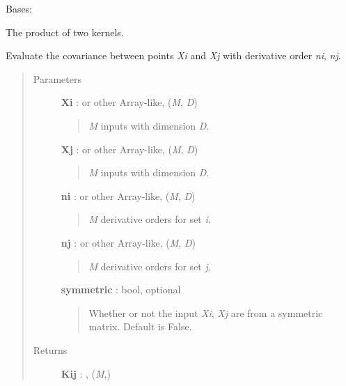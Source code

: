 \documentclass[letterpaper,10pt,english]{sphinxmanual}
\begin{document}
\begin{fulllineitems}
\label{gptools.kernel:gptools.kernel.core.ProductKernel}
Bases: {\hyperref[gptools.kernel:gptools.kernel.core.BinaryKernel]{}}

The product of two kernels.

\begin{fulllineitems}
\label{gptools.kernel:gptools.kernel.core.ProductKernel.__call__}
Evaluate the covariance between points \emph{Xi} and \emph{Xj} with derivative order \emph{ni}, \emph{nj}.
\begin{quote}\begin{description}
\item[{Parameters}] \leavevmode
\textbf{Xi} :  or other Array-like, (\emph{M}, \emph{D})
\begin{quote}

\emph{M} inputs with dimension \emph{D}.
\end{quote}

\textbf{Xj} :  or other Array-like, (\emph{M}, \emph{D})
\begin{quote}

\emph{M} inputs with dimension \emph{D}.
\end{quote}

\textbf{ni} :  or other Array-like, (\emph{M}, \emph{D})
\begin{quote}

\emph{M} derivative orders for set \emph{i}.
\end{quote}

\textbf{nj} :  or other Array-like, (\emph{M}, \emph{D})
\begin{quote}

\emph{M} derivative orders for set \emph{j}.
\end{quote}

\textbf{symmetric} : bool, optional
\begin{quote}

Whether or not the input \emph{Xi}, \emph{Xj} are from a symmetric matrix.
Default is False.
\end{quote}

\item[{Returns}] \leavevmode
\textbf{Kij} : , (\emph{M},)
\begin{quote}


\end{quote}
\end{description}
\end{quote}
\end{fulllineitems}
\end{fulllineitems}
\end{document}
